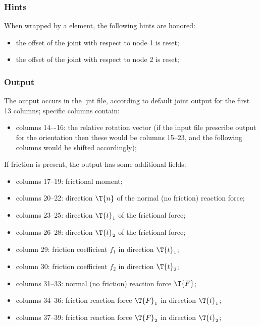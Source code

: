 \subsubsection{Hints}
When wrapped by a  element, the following hints are honored:
\begin{itemize}
\item {} the offset of the joint
with respect to node 1 is reset;
\item {} the offset of the joint
with respect to node 2 is reset;
\end{itemize}
\subsubsection{Output}
The output occurs in the .jnt file, according to default joint output for the first 13 columns; specific
columns contain:
\begin{itemize}
\item  columns 14–-16: the relative rotation vector (if the input file prescribe  output for the orientation then these would be columns 15--23, and the following columns would be shifted accordingly);
\end{itemize}
If friction is present, the output has some additional fields:
\begin{itemize}
\item columns 17--19: frictional moment;
\item columns 20--22: direction $\T{n}$ of the normal (no friction) reaction force;
\item columns 23--25: direction $\T{t}_1$ of the frictional force;
\item columns 26--28: direction $\T{t}_2$ of the frictional force;
\item column 29: friction coefficient $f_1$ in direction $\T{t}_1$;
\item column 30: friction coefficient $f_2$ in direction $\T{t}_2$;
\item columns 31--33: normal (no friction) reaction force $\T{F}$;
\item columns 34--36: friction reaction force $\T{F}_1$ in direction $\T{t}_1$;
\item columns 37--39: friction reaction force $\T{F}_2$ in direction $\T{t}_2$;
\end{itemize}




